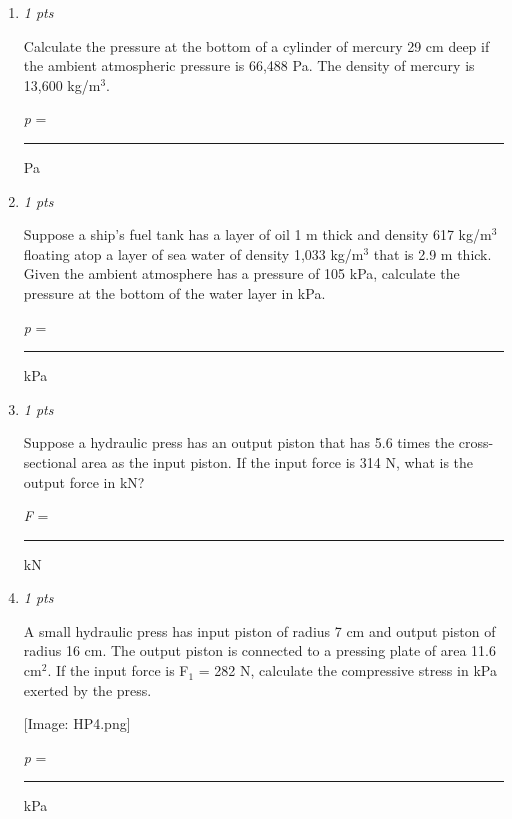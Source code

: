 \documentclass[11pt]{article}
\begin{document}
\begin{enumerate}[leftmargin=*,label=\textbf{Question \arabic*.}]
[Image: barometer01.png]


$p_0=\_\_\_\_\_\;\mathrm{kPa}$

\item \hfill \textit{1 pts}

Calculate the pressure at the bottom of a cylinder of mercury 29 cm deep if the ambient atmospheric pressure is 66,488 Pa. The density of mercury is 13,600 kg/m$^{3}$.



\emph{p} = \rule{2cm}{0.4pt} Pa

\item \hfill \textit{1 pts}

Suppose a ship's fuel tank has a layer of oil 1 m thick and density 617 kg/m$^{3}$ floating atop a layer of sea water of density 1,033 kg/m$^{3}$ that is 2.9 m thick. Given the ambient atmosphere has a pressure of 105 kPa, calculate the pressure at the bottom of the water layer in kPa.



\emph{p} = \rule{2cm}{0.4pt} kPa

\item \hfill \textit{1 pts}

Suppose a hydraulic press has an output piston that has 5.6 times the cross-sectional area as the input piston. If the input force is 314 N, what is the output force in kN?



\emph{F} = \rule{2cm}{0.4pt} kN

\item \hfill \textit{1 pts}

A small hydraulic press has input piston of radius 7 cm and output piston of radius 16 cm. The output piston is connected to a pressing plate of area 11.6 cm$^{2}$. If the input force is F$_{1}$ = 282 N, calculate the compressive stress in kPa exerted by the press.

[Image: HP4.png]

\emph{p} = \rule{2cm}{0.4pt} kPa

\end{enumerate}
\end{document}
